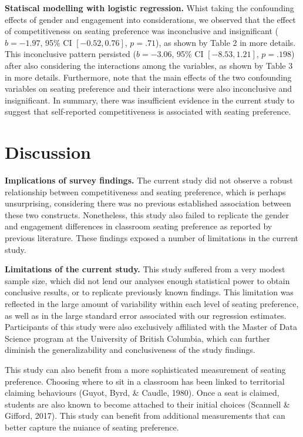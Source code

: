 \documentclass[man]{apa6}
\begin{document}
\textbf{Statiscal modelling with logistic regression.} Whist taking the confounding effects of gender and engagement into considerations, we observed that the effect of competitiveness on seating preference was inconclusive and insignificant (\(b = -1.97\), 95\% CI \([-0.52, 0.76]\), \(p = .71\)), as shown by Table 2 in more details. This inconclusive pattern persisted (\(b = -3.06\), 95\% CI \([-8.53, 1.21]\), \(p = .198\)) after also considering the interactions among the variables, as shown by Table 3 in more details. Furthermore, note that the main effects of the two confounding variables on seating preference and their interactions were also inconclusive and insignificant. In summary, there was insufficient evidence in the current study to suggest that self-reported competitiveness is associated with seating preference.

\hypertarget{discussion}{%
\section{Discussion}\label{discussion}}

\textbf{Implications of survey findings.} The current study did not observe a robust relationship between competitiveness and seating preference, which is perhaps unsurprising, considering there was no previous established association between these two constructs. Nonetheless, this study also failed to replicate the gender and engagement differences in classroom seating preference as reported by previous literature. These findings exposed a number of limitations in the current study.

\textbf{Limitations of the current study.} This study suffered from a very modest sample size, which did not lend our analyses enough statistical power to obtain conclusive results, or to replicate previously known findings. This limitation was reflected in the large amount of variability within each level of seating preference, as well as in the large standard error associated with our regression estimates. Participants of this study were also exclusively affiliated with the Master of Data Science program at the University of British Columbia, which can further diminish the generalizability and conclusiveness of the study findings.

This study can also benefit from a more sophisticated measurement of seating preference. Choosing where to sit in a classroom has been linked to territorial claiming behaviours (Guyot, Byrd, \& Caudle, 1980). Once a seat is claimed, students are also known to become attached to their initial choices (Scannell \& Gifford, 2017). This study can benefit from additional measurements that can better capture the nuiance of seating preference.
\end{document}
